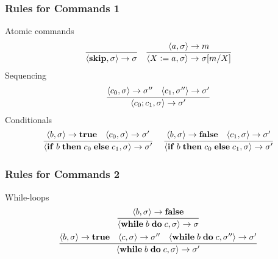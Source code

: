 \documentclass[12pt,aspectratio=169]{beamer}
\def\coloneqq{\mathrel{\mathop:}=}%
\newcommand{\cpair}[1]{\langle #1 \rangle}
\newcommand{\ifthen}[3]{\mathbf{if}\; #1 \; \mathbf{then}\; #2 \; \mathbf{else}\; #3}
\newcommand{\while}[2]{\mathbf{while}\; #1 \; \mathbf{do}\; #2}
\begin{document}
\begin{frame}
    \frametitle{Rules for Commands 1}

    \begin{definition}
        Atomic commands
        \begin{align*}
            \infer{\langle \mathbf{skip} , \sigma\rangle \rightarrow \sigma}{} 
            \;\;\;\; 
            \infer{\cpair{X \coloneqq a, \sigma} \to \sigma[m/X]}{\cpair{a, \sigma} \to m}
        \end{align*}
        Sequencing
            \begin{align*}
            \infer{\langle c_0;c_1, \sigma \rangle \rightarrow \sigma'}{\langle c_0, \sigma \rangle \to \sigma'' & \langle c_1, \sigma'' \rangle \to \sigma'}
        \end{align*}
        Conditionals
        \begin{align*}\infer{\langle \ifthen{b}{c_0}{c_1}, \sigma \rangle \to \sigma'}
            {\cpair{b,\sigma} \to \mathbf{true} & \cpair{c_0, \sigma} \to \sigma'}
            \;\;\;\;\; \infer{\cpair{\ifthen{b}{c_0}{c_1}, \sigma} \to \sigma'}
                {\cpair{b,\sigma} \to \mathbf{false} & \cpair{c_1, \sigma} \to \sigma'}
        \end{align*}
    \end{definition}
\end{frame}

\begin{frame}
    \frametitle{Rules for Commands 2}
    \begin{definition}
        While-loops
        \begin{gather*}
                \infer{\cpair{\while{b}{c}, \sigma} \to \sigma}{\cpair{b, \sigma} \to \mathbf{false}}\\
                \infer{\cpair{\while{b}{c}, \sigma} \to \sigma'}
                {\cpair{b,\sigma} \to \mathbf{true} & \cpair{c, \sigma} \to \sigma'' & \cpair{\while{b}{c},\sigma''} \to \sigma'}
        \end{gather*}

    \end{definition}
\end{frame}
\end{document}
